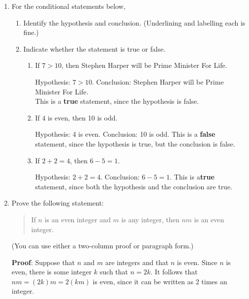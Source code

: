 \documentclass[12pt]{article}
\newcommand{\points}[1]{\marginpar{\hspace{24pt}[#1]}}
\begin{document}
\thispagestyle{fancy}

 \begin{enumerate}
 \item  For the conditional statements below,
\begin{enumerate}
 \item Identify the hypothesis and conclusion. (Underlining and labelling each is fine.)
 \item Indicate whether the statement is true or false. 
\begin{enumerate}
 \item If $7>10$, then Stephen Harper will be Prime Minister For Life. \points{2}

\bigskip

Hypothesis: $7>10$. Conclusion: Stephen Harper will be Prime Minister For Life.\\
This is a {\bf true} statement, since the hypothesis is false.

\bigskip
 
 
 \item If $4$ is even, then 10 is odd. \points{2}

\bigskip

Hypothesis: 4 is even. Conclusion: 10 is odd.
This is a {\bf false} statement, since the hypothesis is true, but the conclusion is false.

\bigskip

 \item If $2+2=4$, then $6-5 = 1$. \points{2}
 
 \bigskip
 
 Hypothesis: $2+2=4$. Conclusion: $6-5=1$.
 This is a{\bf true} statement, since both the hypothesis and the conclusion are true.
\end{enumerate}

\end{enumerate}

\bigskip

\item Prove the following statement:
\begin{quotation}
 If $n$ is an even integer and $m$ is any integer, then $nm$ is an even integer.\points{4}
\end{quotation}
(You can use either a two-column proof or paragraph form.)

\bigskip


{\bf Proof}: Suppose that $n$ and $m$ are integers and that $n$ is even. Since $n$ is even, there is some integer $k$ such that $n=2k$. It follows that $nm = (2k)m = 2(km)$ is even, since it can be written as 2 times an integer.
 \end{enumerate}
\end{document}
